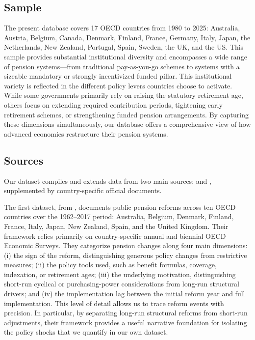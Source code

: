 \documentclass[11pt,english,a4paper, twoside, authoryear]{article}
\begin{document}
\subsection{Sample}
The present database covers 17 OECD countries from 1980 to 2025: Australia, Austria, Belgium, Canada, Denmark, Finland, France, Germany, Italy, Japan, the Netherlands, New Zealand, Portugal, Spain, Sweden, the UK, and the US. This sample provides substantial institutional diversity and encompasses a wide range of pension systems---from traditional pay-as-you-go schemes to systems with a sizeable mandatory or strongly incentivized funded pillar. This institutional variety is reflected in the different policy levers countries choose to activate. While some governments primarily rely on raising the statutory retirement age, others focus on extending required contribution periods, tightening early retirement schemes, or strengthening funded pension arrangements. By capturing these dimensions simultaneously, our database offers a comprehensive view of how advanced economies restructure their pension systems.

\subsection{Sources}

Our dataset compiles and extends data from two main sources: \citet{BiZubairy2023} and \citet{romp_political_2024}, supplemented by country-specific official documents.


The first dataset, from \citet{BiZubairy2023}, documents public pension reforms across ten OECD countries over the 1962--2017 period: Australia, Belgium, Denmark, Finland, France, Italy, Japan, New Zealand, Spain, and the United Kingdom. Their framework relies primarily on country-specific annual and biennial OECD Economic Surveys. They categorize pension changes along four main dimensions: (i) the sign of the reform, distinguishing generous policy changes from restrictive measures; (ii) the policy tools used, such as benefit formulas, coverage, indexation, or retirement ages; (iii) the underlying motivation, distinguishing short-run cyclical or purchasing-power considerations from long-run structural drivers; and (iv) the implementation lag between the initial reform year and full implementation. This level of detail allows us to trace reform events with precision. In particular, by separating long-run structural reforms from short-run adjustments, their framework provides a useful narrative foundation for isolating the policy shocks that we quantify in our own dataset.
\end{document}
